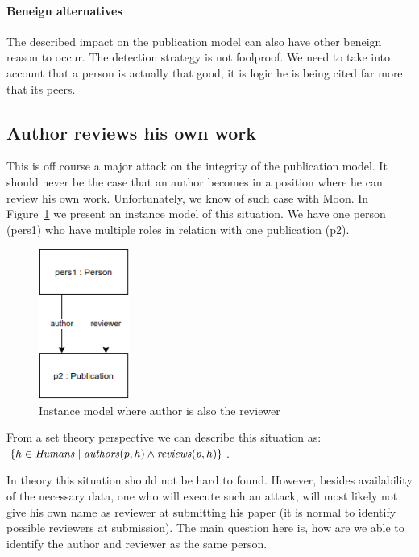 \documentclass{ou-report}
\begin{document}
\paragraph{Beneign alternatives}
The described impact on the publication model can also have other beneign reason 
to occur. The detection strategy is not foolproof. We need to take into account 
that a person is actually that good, it is logic he is being cited far more that 
its peers.

\subsection{Author reviews his own work}
This is off course a major attack on the integrity of the publication model. It 
should never be the case that an author becomes in a position where he can 
review his own work. Unfortunately, we know of such case with Moon. In 
Figure~\ref{fig:air} we present an instance model of this situation. We have one 
person (pers1) who have multiple roles in relation with one publication (p2).

\begin{figure}[H]
\centering
\includegraphics[width=3cm]{images/author_is_reviewer.drawio.png}
\caption{Instance model where author is also the reviewer}
\label{fig:air}
\end{figure}
From a set theory perspective we can describe this situation as: 
$\{h \in \mathit{Humans} \mid \mathit{authors}(p, h) \land \mathit{reviews}(p, h)\}$.

In theory this situation should not be hard to found. However, besides 
availability of the necessary data, one who will execute such an attack, will 
most likely not give his own name as reviewer at submitting his paper (it is 
normal to identify possible reviewers at submission). The main question here 
is, how are we able to identify the author and reviewer as the same person.
\end{document}
